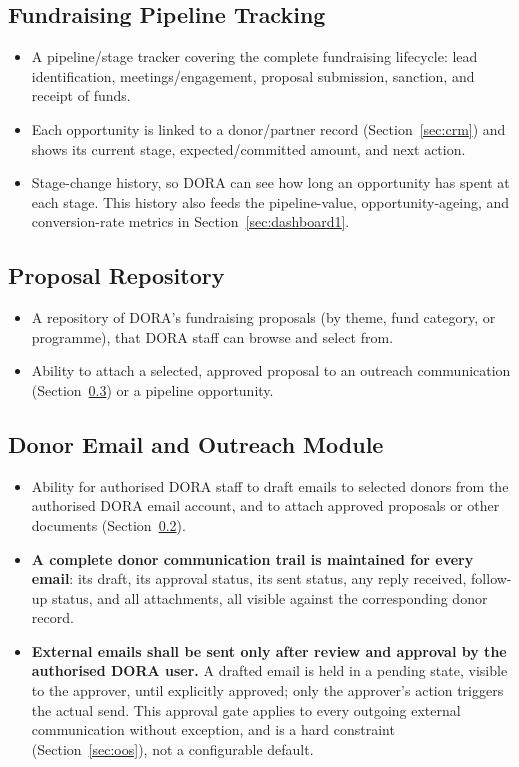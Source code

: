 \documentclass[11pt]{article}
\begin{document}
\subsection{Fundraising Pipeline Tracking}
\label{sec:pipeline}
\begin{itemize}[leftmargin=1.4em, itemsep=3pt]
\item A pipeline/stage tracker covering the complete fundraising lifecycle: lead identification, meetings/engagement, proposal submission, sanction, and receipt of funds.
\item Each opportunity is linked to a donor/partner record (Section~\ref{sec:crm}) and shows its current stage, expected/committed amount, and next action.
\item Stage-change history, so DORA can see how long an opportunity has spent at each stage. This history also feeds the pipeline-value, opportunity-ageing, and conversion-rate metrics in Section~\ref{sec:dashboard1}.
\end{itemize}

\subsection{Proposal Repository}
\label{sec:proposals}
\begin{itemize}[leftmargin=1.4em, itemsep=3pt]
\item A repository of DORA's fundraising proposals (by theme, fund category, or programme), that DORA staff can browse and select from.
\item Ability to attach a selected, approved proposal to an outreach communication (Section~\ref{sec:email}) or a pipeline opportunity.
\end{itemize}

\subsection{Donor Email and Outreach Module}
\label{sec:email}
\begin{itemize}[leftmargin=1.4em, itemsep=3pt]
\item Ability for authorised DORA staff to draft emails to selected donors from the authorised DORA email account, and to attach approved proposals or other documents (Section~\ref{sec:proposals}).
\item \textbf{A complete donor communication trail is maintained for every email}: its draft, its approval status, its sent status, any reply received, follow-up status, and all attachments, all visible against the corresponding donor record.
\item \textbf{External emails shall be sent only after review and approval by the authorised DORA user.} A drafted email is held in a pending state, visible to the approver, until explicitly approved; only the approver's action triggers the actual send. This approval gate applies to every outgoing external communication without exception, and is a hard constraint (Section~\ref{sec:oos}), not a configurable default.
\end{itemize}
\end{document}
